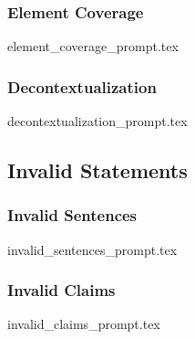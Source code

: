 \subsubsection{Element Coverage}
\label{app:element_coverage}
{element_coverage_prompt.tex}

\subsubsection{Decontextualization}
{decontextualization_prompt.tex}

\subsection{Invalid Statements}
\label{app:invalid_statements_prompts}
\subsubsection{Invalid Sentences}
{invalid_sentences_prompt.tex}

\subsubsection{Invalid Claims}
{invalid_claims_prompt.tex}

\twocolumn



